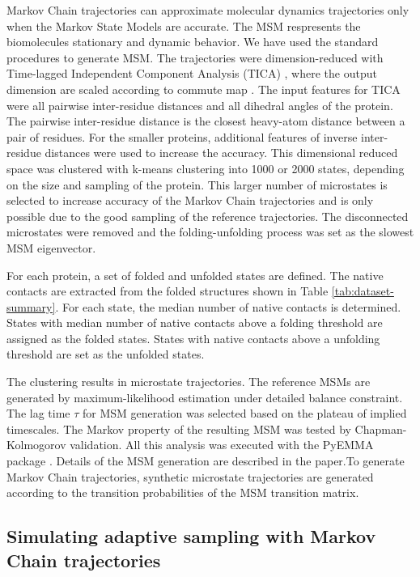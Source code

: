 Markov Chain trajectories can approximate molecular dynamics trajectories only when the Markov State Models are accurate. The MSM respresents the biomolecules stationary and dynamic behavior. 
We have used the standard procedures to generate MSM. The trajectories were dimension-reduced with Time-lagged Independent Component Analysis (TICA) 
\cite{TICA1-perez2013, TICA2-schwantes2013}, where the output dimension are scaled according to commute map 
\cite{noe2016commute}. The input features for TICA were all pairwise
inter-residue distances and all dihedral angles of the protein.  The pairwise
inter-residue distance is the closest heavy-atom distance between a pair of residues. 
For the smaller proteins,  additional features of inverse inter-residue distances were used to increase the accuracy. This dimensional reduced space was clustered with k-means clustering into 1000 or 2000 states, depending on the size and sampling of the protein. This larger number of microstates is selected to increase accuracy of the Markov Chain trajectories and is only possible due to the good sampling of the reference trajectories. The disconnected microstates were removed and the folding-unfolding process was set as the slowest MSM eigenvector. 

For each protein, a set of folded and unfolded states are defined. The native contacts are extracted from the folded structures shown in Table \ref{tab:dataset-summary}. For each state, the median number of native
contacts is determined. States with median number of native contacts above a folding threshold are assigned as the folded states. States with native contacts above a unfolding threshold are set as the unfolded states.

The clustering results in microstate trajectories. The reference MSMs are generated by maximum-likelihood estimation under detailed balance
constraint. The lag time $\tau$ for MSM generation was selected based on the plateau of implied timescales. The Markov property of the resulting MSM was tested by Chapman-Kolmogorov validation. All this
analysis was executed with the PyEMMA package \cite{scherer2015pyemma}. Details of the MSM generation are described in the paper\cite{Adstrategies2018}.To generate Markov Chain trajectories, synthetic microstate trajectories are generated according to the transition probabilities of the MSM transition matrix.

 

\subsection{\label{sec:level5}Simulating adaptive sampling with Markov Chain trajectories}

